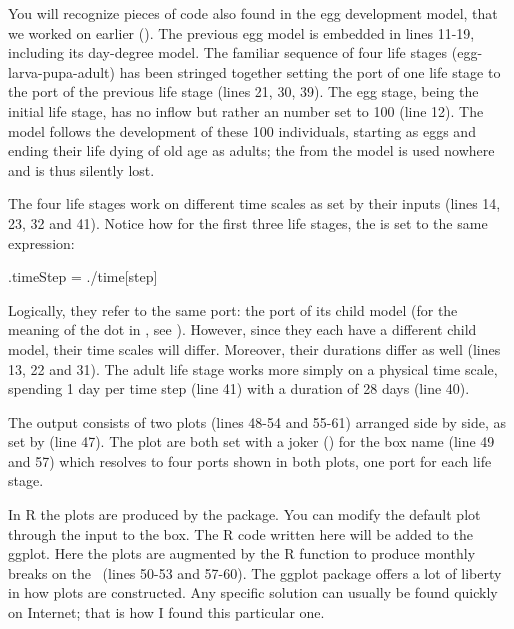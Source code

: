 You will recognize pieces of code also found in the egg development model, that we worked on earlier (). The previous egg model is embedded  in lines 11-19, including its day-degree model. The familiar sequence of four life stages (egg-larva-pupa-adult) has been stringed together setting the  port of one life stage to the  port of the previous life stage (lines 21, 30, 39). The egg stage, being the initial life stage, has no inflow but rather an  number set to 100 (line 12). The model follows the development of these 100 individuals, starting as eggs and ending their life dying of old age as adults; the  from the  model is used nowhere and is thus silently lost.

The four life stages work on different time scales as set by their  inputs (lines 14, 23, 32 and 41). Notice how for the first three life stages, the  is set to the same expression:
\begin{boxscript}
.timeStep = ./time[step]
\end{boxscript}

Logically, they refer to the same port: the  port of its  child model (for the meaning of the dot in , see ). However, since they each have a different  child model, their time scales will differ. Moreover, their durations differ as well (lines 13, 22 and 31). The adult life stage works more simply on a physical time scale, spending 1 day per time step (line 41) with a duration of 28 days (line 40).

The output consists of two plots (lines 48-54 and 55-61) arranged side by side, as set by  (line 47). The plot  are both set with a joker () for the box name (line 49 and 57) which resolves to four ports shown in both plots, one port for each life stage.

In R the plots are produced by the  package. You can modify the default plot through the  input to the  box. The R code written here will be added to the ggplot. Here the plots are augmented by the  R function to produce monthly breaks on the \xaxis\ (lines 50-53 and 57-60). The ggplot package offers a lot of liberty in how plots are constructed. Any specific solution can usually be found quickly on Internet; that is how I found this particular one.


